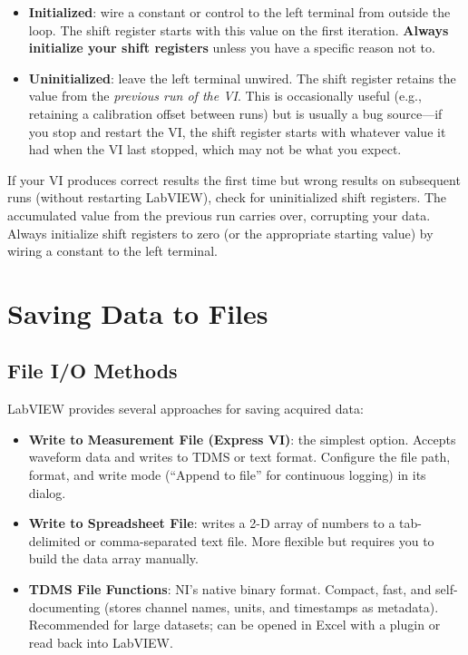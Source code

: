 \begin{itemize}[leftmargin=1.5em]
\item \textbf{Initialized}: wire a constant or control to the left terminal from outside the loop. The shift register starts with this value on the first iteration. \textbf{Always initialize your shift registers} unless you have a specific reason not to.
\item \textbf{Uninitialized}: leave the left terminal unwired. The shift register retains the value from the \emph{previous run of the VI}. This is occasionally useful (e.g., retaining a calibration offset between runs) but is usually a bug source---if you stop and restart the VI, the shift register starts with whatever value it had when the VI last stopped, which may not be what you expect.
\end{itemize}

\begin{warningbox}
If your VI produces correct results the first time but wrong results on subsequent runs (without restarting LabVIEW), check for uninitialized shift registers. The accumulated value from the previous run carries over, corrupting your data. Always initialize shift registers to zero (or the appropriate starting value) by wiring a constant to the left terminal.
\end{warningbox}

\section{Saving Data to Files}
\label{sec:lv_file_io}

\subsection{File I/O Methods}

LabVIEW provides several approaches for saving acquired data:

\begin{itemize}[leftmargin=1.5em]
\item \textbf{Write to Measurement File (Express VI)}: the simplest option. Accepts waveform data and writes to TDMS or text format. Configure the file path, format, and write mode (``Append to file'' for continuous logging) in its dialog.
\item \textbf{Write to Spreadsheet File}: writes a 2-D array of numbers to a tab-delimited or comma-separated text file. More flexible but requires you to build the data array manually.
\item \textbf{TDMS File Functions}: NI's native binary format. Compact, fast, and self-documenting (stores channel names, units, and timestamps as metadata). Recommended for large datasets; can be opened in Excel with a plugin or read back into LabVIEW.
\end{itemize}

